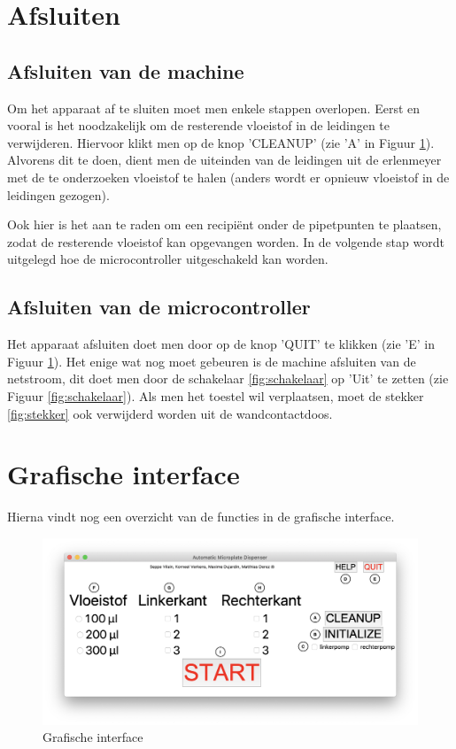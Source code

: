 \documentclass[a4paper,twoside,kulak]{kulakreport} %
\begin{document}
\chapter*{Afsluiten}

\section*{Afsluiten van de machine}
\label{sec:cleanup}

Om het apparaat af te sluiten moet men enkele stappen overlopen. Eerst en vooral is het noodzakelijk om de resterende vloeistof in de leidingen te verwijderen. Hiervoor klikt men op de knop 'CLEANUP' (zie 'A' in Figuur \ref{fig:GI_letters}). Alvorens dit te doen, dient men de uiteinden van de leidingen uit de erlenmeyer met de te onderzoeken vloeistof te halen (anders wordt er opnieuw vloeistof in de leidingen gezogen).


 Ook hier is het aan te raden om een recipiënt onder de pipetpunten te plaatsen, zodat de resterende vloeistof kan opgevangen worden. In de volgende stap wordt uitgelegd hoe de microcontroller uitgeschakeld kan worden.
 
 
\section*{Afsluiten van de microcontroller }
 
Het apparaat afsluiten doet men door op de knop 'QUIT' te klikken (zie 'E' in Figuur \ref{fig:GI_letters}). Het enige wat nog moet gebeuren is de machine afsluiten van de netstroom, dit doet men door de schakelaar \ref{fig:schakelaar} op 'Uit' te zetten (zie Figuur \ref{fig:schakelaar}). Als men het toestel wil verplaatsen, moet de stekker \ref{fig:stekker} ook verwijderd worden uit de wandcontactdoos. 

\chapter*{Grafische interface}

Hierna vindt nog een overzicht van de functies in de grafische interface. 

\begin{figure}[h]
	\centering
	\includegraphics[width=1.2\textwidth]{GI_letters}
	\caption{Grafische interface}
	\label{fig:GI_letters}
\end{figure}
\end{document}

